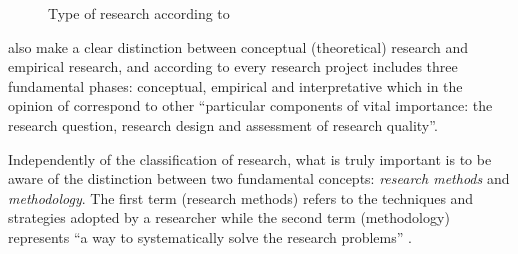 \documentclass[output=paper]{LSP/langsci}
\begin{document}
\begin{figure}
    \caption{Type of research according to \citet{Kumar2008}}
    \label{bodzer-lazaro:fig:1}
\end{figure}

\citet{Williams2002} also make a clear distinction between conceptual (theoretical) research and empirical research, and according to \citet{Borja2009} every research project includes three fundamental phases: conceptual, empirical and interpretative which in the opinion of \citet[102]{Halverson2009} correspond to other ``particular components of vital importance: the research question, research design and assessment of research quality''.

Independently of the classification of research, what is truly important is to be aware of the distinction between two fundamental concepts: \textit{research methods} and \textit{methodology}. The first term (research methods) refers to the techniques and strategies adopted by a researcher while the second term (methodology) represents ``a way to systematically solve the research problems'' \citep[5]{Kumar2008}.
\end{document}
